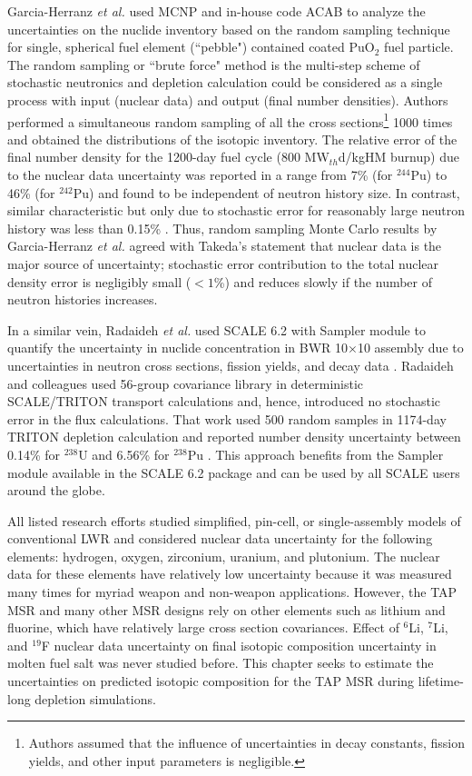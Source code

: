 Garcia-Herranz \emph{et al.} used MCNP and in-house code ACAB to analyze the 
uncertainties on the nuclide inventory based on the random sampling technique 
for single, spherical fuel element (``pebble") contained coated PuO$_2$ fuel 
particle. The random sampling or ``brute force" method is the multi-step 
scheme of stochastic neutronics and depletion calculation could be considered 
as a single process with input (nuclear data) and output (final number 
densities). Authors performed a simultaneous random sampling of all the cross 
sections\footnote{Authors assumed that the influence of uncertainties in decay 
constants, fission yields, and other input parameters is negligible.} 1000 
times and obtained the distributions of the isotopic inventory. The relative 
error of the final number density for the 1200-day fuel cycle (800 
MW$_{th}$d/kgHM burnup) due to the nuclear data uncertainty was reported in a 
range from 7\% (for $^{244}$Pu) to 46\% (for $^{242}$Pu) and found to be 
independent of neutron history size. 
In contrast, similar characteristic but only due to stochastic error for 
reasonably large neutron history was less than 0.15\% 
\cite{garcia-herranz_propagation_2008}. Thus, random sampling Monte Carlo 
results by Garcia-Herranz \emph{et al.} agreed with Takeda's statement that 
nuclear data is the major source of uncertainty; stochastic error contribution 
to the total nuclear density error is negligibly small ($<1$\%) and reduces
slowly if the number of neutron histories increases.

In a similar vein, Radaideh \emph{et al.} used SCALE 6.2 with Sampler module
\cite{rearden_scale_2018} to quantify the uncertainty in nuclide concentration 
in \gls{BWR} 10$\times$10 assembly due to uncertainties in neutron cross 
sections, fission yields, and decay data \cite{radaideh_using_2019-1}.  
Radaideh and colleagues used 56-group covariance library in deterministic 
SCALE/TRITON transport calculations and, hence, introduced no stochastic error 
in the flux calculations. That work used 500 random samples in 1174-day TRITON 
depletion calculation and reported number density uncertainty between 0.14\% 
for $^{238}$U and 6.56\% for $^{238}$Pu \cite{radaideh_combining_2019-1}. This 
approach benefits from the Sampler module available in the SCALE 6.2 package 
and can be used by all SCALE users around the globe.

All listed research efforts studied simplified, pin-cell, or single-assembly 
models of conventional \gls{LWR} and considered nuclear data uncertainty for 
the following elements: hydrogen, oxygen, zirconium, uranium, and plutonium. 
The nuclear data for these elements have relatively low uncertainty because it 
was measured many times for myriad weapon and non-weapon applications. 
However, the \gls{TAP} \gls{MSR} and many other \gls{MSR} designs rely on 
other elements such as lithium and fluorine, which have relatively large cross 
section covariances. Effect of $^6$Li, $^7$Li, and $^{19}$F nuclear data 
uncertainty 
on final isotopic composition uncertainty in molten fuel salt was never 
studied before. This chapter seeks to estimate the uncertainties on predicted 
isotopic composition for the \gls{TAP} \gls{MSR} during lifetime-long 
depletion simulations.

